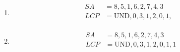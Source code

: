 \begin{enumerate}
    \item \begin{align*}
              SA  & = 8, 5, 1, 6, 2, 7, 4, 3                 \\
              LCP & = \text{UND}, 0, 3, 1, 2, 0, 1, \text{ } \\
          \end{align*}
    \item \begin{align*}
              SA  & = 8, 5, 1, 6, 2, 7, 4, 3          \\
              LCP & = \text{UND}, 0, 3, 1, 2, 0, 1, 1 \\
          \end{align*}
\end{enumerate}


